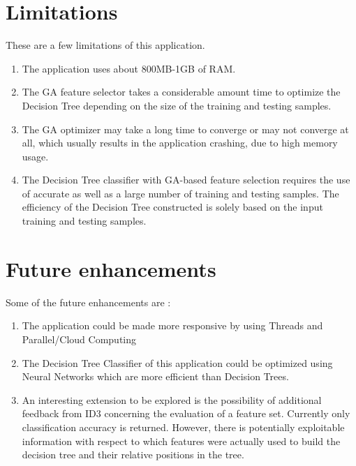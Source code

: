\documentclass[12pt]{report}
\begin{document}
\section{Limitations}
These are a few limitations of this application.
\begin{enumerate}
\item{The application uses about 800MB-1GB of RAM.}

\item{The GA feature selector takes a considerable amount time to optimize the Decision Tree depending on the size of the training and testing samples.}
\item{The GA optimizer may take a long time to converge or may not converge at all, which usually results in the application crashing, due to high memory usage.}
\item{ The Decision Tree classifier with GA-based feature selection requires the use of accurate as well as a large number of training and testing samples. The efficiency of the Decision Tree constructed is solely based on the input training and testing samples.}

\end{enumerate}
\section{Future enhancements}
Some of the future enhancements are :
\begin{enumerate}
\item{The application could be made more responsive by using Threads and Parallel/Cloud Computing}
\item{The Decision Tree Classifier of this application could be optimized using Neural Networks which are more efficient than Decision Trees.}
\item{An interesting extension to be explored is the possibility of
additional feedback from ID3 concerning the evaluation of a
feature set. Currently only classification accuracy is returned.
However, there is potentially exploitable information with
respect to which features were actually used to build the
decision tree and their relative positions in the tree.}

\end{enumerate}

\newpage
\end{document}
